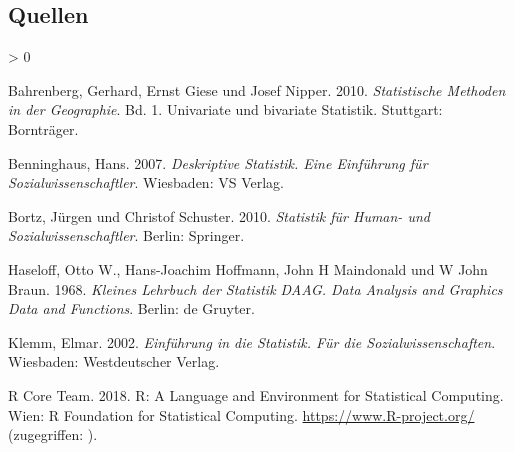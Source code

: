 \documentclass[
  ngerman,
]{article}
\newlength{\cslhangindent}
\newenvironment{CSLReferences}[2] %
 {%
  \setlength{\parindent}{0pt}
  \ifodd #1 \everypar{\setlength{\hangindent}{\cslhangindent}}\ignorespaces\fi
  \ifnum #2 > 0
  \setlength{\parskip}{#2\baselineskip}
  \fi
 }%
 {}
\begin{document}
\pagebreak

\hypertarget{quellen-9}{%
\subsection{Quellen}\label{quellen-9}}

\hypertarget{refs}{}
\begin{CSLReferences}{1}{0}
\leavevmode\hypertarget{ref-bahrenberg}{}%
Bahrenberg, Gerhard, Ernst Giese und Josef Nipper. 2010. \emph{Statistische Methoden in der Geographie}. Bd. 1. Univariate und bivariate Statistik. Stuttgart: Bornträger.

\leavevmode\hypertarget{ref-benninghaus}{}%
Benninghaus, Hans. 2007. \emph{Deskriptive Statistik. Eine Einführung für Sozialwissenschaftler}. Wiesbaden: VS Verlag.

\leavevmode\hypertarget{ref-bortz}{}%
Bortz, Jürgen und Christof Schuster. 2010. \emph{Statistik für Human- und Sozialwissenschaftler}. Berlin: Springer.

\leavevmode\hypertarget{ref-haseloff}{}%
Haseloff, Otto W., Hans-Joachim Hoffmann, John H Maindonald und W John Braun. 1968. \emph{Kleines Lehrbuch der Statistik DAAG. Data Analysis and Graphics Data and Functions}. Berlin: de Gruyter.

\leavevmode\hypertarget{ref-klemm}{}%
Klemm, Elmar. 2002. \emph{Einführung in die Statistik. Für die Sozialwissenschaften}. Wiesbaden: Westdeutscher Verlag.

\leavevmode\hypertarget{ref-r}{}%
R Core Team. 2018. R: A Language and Environment for Statistical Computing. Wien: R Foundation for Statistical Computing. \url{https://www.R-project.org/} (zugegriffen: ).

\end{CSLReferences}
\end{document}

